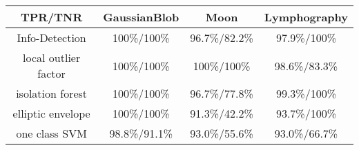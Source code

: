 \begin{tabular}{cccc}
\hline
       TPR/TNR        &  GaussianBlob   &      Moon       &  Lymphography  \\
\hline
    Info-Detection    & 100\%/100\% &  96.7\%/82.2\%  & 97.9\%/100\% \\
 local outlier factor & 100\%/100\% & 100\%/100\% & 98.6\%/83.3\%  \\
   isolation forest   & 100\%/100\% &  96.7\%/77.8\%  & 99.3\%/100\% \\
  elliptic envelope   & 100\%/100\% &  91.3\%/42.2\%  & 93.7\%/100\% \\
    one class SVM     &  98.8\%/91.1\%  &  93.0\%/55.6\%  & 93.0\%/66.7\%  \\
\hline
\end{tabular}